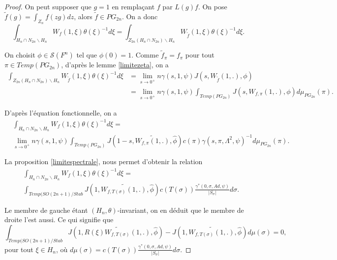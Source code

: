 \documentclass{amsart}
\begin{document}
\begin{proof}
On peut supposer que $g = 1$ en remplaçant $f$ par $L(g)f$. On pose $\widetilde{f}(g) = \int_{Z_n} f(zg) dz$, alors $\widetilde{f} \in PG_{2n}$. On a donc
\begin{equation}
\int_{H_n \cap N_{2n} \backslash H_n} W_f(1, \xi) \theta(\xi)^{-1} d\xi = \int_{Z_{2n}(H_n \cap N_{2n}) \backslash H_n} W_{\widetilde{f}}(1, \xi) \theta(\xi)^{-1} d\xi.
\end{equation}

On choisit $\phi \in \mathcal{S}(F^n)$ tel que $\phi(0) = 1$. Comme $\widetilde{f}_\pi = f_\pi$ pour tout $\pi \in Temp(PG_{2n})$, d'après le lemme \ref{limitezeta}, on a
\begin{equation}
\begin{split}
\int_{Z_{2n}(H_n \cap N_{2n}) \backslash H_n} W_{\widetilde{f}}(1, \xi) \theta(\xi)^{-1} d\xi &= \lim_{s\rightarrow 0^+} n\gamma(s, 1, \psi) J(s, W_{\widetilde{f}}(1, .), \phi) \\
&= \lim_{s\rightarrow 0^+} n\gamma(s, 1, \psi) \int_{Temp(PG_{2n})}J(s, W_{f, \pi}(1, .), \phi) d\mu_{PG_{2n}}(\pi).
\end{split}
\end{equation}

D'après l'équation fonctionnelle, on a
\begin{equation}
\begin{split}
&\int_{H_n \cap N_{2n} \backslash H_n} W_f(1, \xi) \theta(\xi)^{-1} d\xi = \\
&\lim_{s\rightarrow 0^+} n\gamma(s, 1, \psi) \int_{Temp(PG_{2n})}J(1-s, \widetilde{W_{f, \pi}(1, .)}, \widehat{\phi}) c(\pi) \gamma(s, \pi, \Lambda^2, \psi)^{-1} d\mu_{PG_{2n}}(\pi).
\end{split}
\end{equation}

La proposition \ref{limitespectrale}, nous permet d'obtenir la relation
\begin{equation}
\label{relspec}
\begin{split}
&\int_{H_n \cap N_{2n} \backslash H_n} W_f(1, \xi) \theta(\xi)^{-1} d\xi =\\
&\int_{Temp(SO(2n+1)/Stab} J(1, \widetilde{W_{f, T(\sigma)}(1,.)}, \widehat{\phi}) c(T(\sigma)) \frac{\gamma^*(0, \sigma, Ad, \psi)}{|S_\sigma|} d\sigma.
\end{split}
\end{equation}

Le membre de gauche étant $(H_n, \theta)$-invariant, on en déduit que le membre de droite l'est aussi. Ce qui signifie que
\begin{equation}
\int_{Temp(SO(2n+1)/Stab} J(1, \widetilde{R(\xi)W_{f, T(\sigma)}(1,.)}, \widehat{\phi})-J(1, \widetilde{W_{f, T(\sigma)}(1,.)}, \widehat{\phi}) d\mu(\sigma) = 0,
\end{equation}
pour tout $\xi \in H_n$, où $d\mu(\sigma) = c(T(\sigma)) \frac{\gamma^*(0, \sigma, Ad, \psi)}{|S_\sigma|} d\sigma$.


\end{proof}
\end{document}
